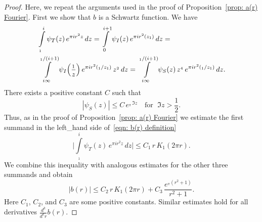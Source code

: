 \begin{proof}
Here, we repeat the arguments used in the proof of Proposition~\ref{prop: a(r) Fourier}. First we show that $b$ is a Schwartz function. We have
\begin{align}
  &\int\limits_{_1}^{i}\psi_T(z)\,e^{\pi i r^2 z}\,dz=\int\limits_{0}^{i+1}\psi_I(z)\,e^{\pi i r^2 (z_1)}\,dz=\notag\\
  &\int\limits_{i\infty}^{_1/(i+1)}\psi_I\Big(\frac{_1}{z}\Big)\,e^{\pi i r^2 (_1/z_1)}\,z^{_2}\,dz=\int\limits_{i\infty}^{_1/(i+1)}\psi_S(z)\,z^{_4}\,e^{\pi i r^2 (_1/z_1)}\,dz.\notag
\end{align}
There exists a positive constant $C$ such that
$$|\psi_S(z)|\leq C\,e^{_\pi\,\Im{z}}\quad\mbox{for }\;\Im{z}>\frac12.$$
Thus, as in the proof of Proposition~\ref{prop: a(r) Fourier} we estimate the first summand in the left_hand side of~\eqref{eqn: b(r) definition}
$$\Bigg|\int\limits_{_1}^i \psi_T(z)\,e^{\pi i r^2 z}\,dz \Bigg|\leq C_1\,r\,K_1(2\pi r).$$
We combine this inequality with analogous estimates for the other three summands and obtain
$$|b(r)|\leq C_2\,r\,K_1(2\pi r)+C_3\,\frac{e^{_\pi(r^2+1)}}{r^2+1}.$$
Here $C_1$, $C_2$, and $C_3$ are some positive constants. Similar estimates hold for all derivatives $\frac{d^k}{d^k r} b(r)$.


\end{proof}
